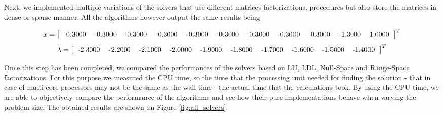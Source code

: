Next, we implemented multiple variations of the solvers that use different matrices factorizations, procedures but also store the matrices in dense or sparse manner. All the algorithms however output the same results being

\[
  x =
  \begin{bmatrix}
    \begin{tabular}{lllllllllll}
-0.3000 & -0.3000 & -0.3000 & -0.3000 & -0.3000 & -0.3000 & -0.3000 & -0.3000 & -0.3000 & -1.3000 & 1.0000
\end{tabular}
  \end{bmatrix}^T\]
\]
\[
  \lambda =
  \begin{bmatrix}
    \begin{tabular}{llllllllll}
-2.3000 & -2.2000 & -2.1000 & -2.0000 & -1.9000 & -1.8000 & -1.7000 & -1.6000 & -1.5000 & -1.4000
\end{tabular}
  \end{bmatrix}^T\]
\]


Once this step has been completed, we compared the performances of the solvers based on LU, LDL, Null-Space and Range-Space factorizations. For this purpose we measured the CPU time, so the time that the processing unit needed for finding the solution - that in case of multi-core processors may not be the same as the wall time - the actual time that the calculations took. By using the CPU time, we are able to objectively compare the performance of the algorithms and see how their pure implementations behave when varying the problem size. The obtained results are shown on Figure \ref{fig:all_solvers}.

